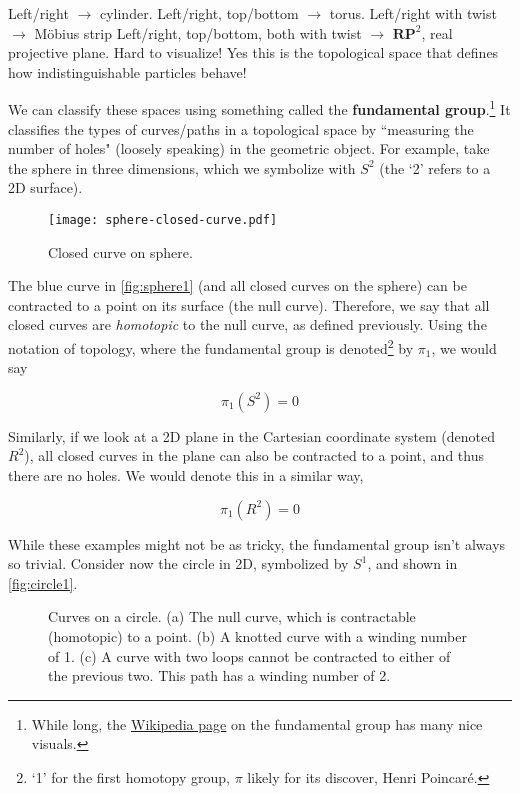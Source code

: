 \documentclass[12pt, english]{book}
\begin{document}
Left/right $\rightarrow$ cylinder.
Left/right, top/bottom $\rightarrow$ torus.
Left/right with twist $\rightarrow$ M{\"o}bius strip
Left/right, top/bottom, both with twist $\rightarrow$ $\mathbf{RP}^2$, real projective plane.
Hard to visualize!
Yes this is the topological space that defines how indistinguishable particles behave!

We can classify these spaces using something called the \textbf{fundamental group}.\footnote{While long, the \href{https://en.wikipedia.org/wiki/Fundamental_group}{Wikipedia page} on the fundamental group has many nice visuals.}
It classifies the types of curves/paths in a topological space by ``measuring the number of holes" (loosely speaking) in the geometric object.
For example, take the sphere in three dimensions, which we symbolize with $S^2$ (the `2' refers to a 2D surface).

\begin{figure}[!ht]
	\centering 
	\texttt{[image: sphere-closed-curve.pdf]}
	\caption{Closed curve on sphere.}
	\label{fig:sphere1}
\end{figure}

The blue curve in \autoref{fig:sphere1} (and all closed curves on the sphere) can be contracted to a point on its surface (the null curve).
Therefore, we say that all closed curves are \emph{homotopic} to the null curve, as defined previously.
Using the notation of topology, where the fundamental group is denoted\footnote{`1' for the first homotopy group, $\pi$ likely for its discover, Henri Poincar{\'e}.} by $\pi_1$, we would say 

\begin{equation*}
	\pi_1(S^2) = 0
\end{equation*}

Similarly, if we look at a 2D plane in the Cartesian coordinate system (denoted $R^2$), all closed curves in the plane can also be contracted to a point, and thus there are no holes.
We would denote this in a similar way, 

\begin{equation*}
	\pi_1(R^2) = 0
\end{equation*}

While these examples might not be as tricky, the fundamental group isn't always so trivial.
Consider now the circle in 2D, symbolized by $S^1$, and shown in \autoref{fig:circle1}.

\begin{figure}[!ht]
	\centering 
	 \hfill
	 \hfill
	\caption{Curves on a circle.
	(a) The null curve, which is contractable (homotopic) to a point.
	(b) A knotted curve with a winding number of 1.
	(c) A curve with two loops cannot be contracted to either of the previous two. 
	This path has a winding number of 2.}
	\label{fig:circle1}
\end{figure}
\end{document}
